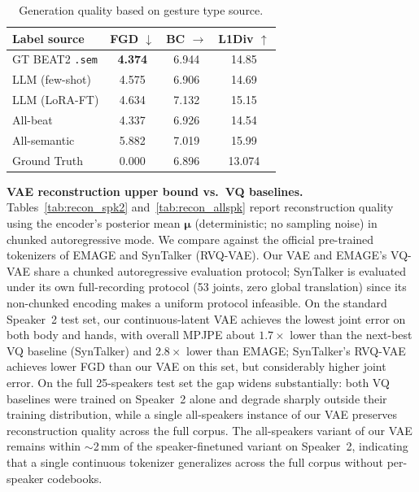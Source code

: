\begin{table}[t]
\scriptsize
\caption{Generation quality based on gesture type source.}%
\label{tab:planner_downstream}
\begin{tabular}{lccc}
\toprule
\textbf{Label source} & \textbf{FGD $\downarrow$} & \textbf{BC $\rightarrow$} & \textbf{L1Div $\uparrow$} \\
\midrule
GT BEAT2 \texttt{.sem}      & \textbf{4.374} & 6.944 & 14.85 \\
LLM (few-shot)              & 4.575          & 6.906 & 14.69 \\
LLM (LoRA-FT)               & 4.634          & 7.132 & 15.15 \\
All-beat                    & 4.337          & 6.926 & 14.54 \\
All-semantic                & 5.882          & 7.019 & 15.99 \\
\midrule
Ground Truth                & 0.000          & 6.896 & 13.074 \\
\bottomrule
\end{tabular}
\end{table}



\noindent \textbf{VAE reconstruction upper bound vs.\ VQ baselines.}
Tables~\ref{tab:recon_spk2} and~\ref{tab:recon_allspk} report reconstruction quality using the encoder's posterior mean $\boldsymbol{\mu}$ (deterministic; no sampling noise) in chunked autoregressive mode.
We compare against the official pre-trained tokenizers of EMAGE and SynTalker (RVQ-VAE).
Our VAE and EMAGE's VQ-VAE share a chunked autoregressive evaluation protocol; SynTalker is evaluated under its own full-recording protocol (53 joints, zero global translation) since its non-chunked encoding makes a uniform protocol infeasible.
On the standard Speaker~2 test set, our continuous-latent VAE achieves the lowest joint error on both body and hands, with overall MPJPE about $1.7{\times}$ lower than the next-best VQ baseline (SynTalker) and $2.8{\times}$ lower than EMAGE; SynTalker's RVQ-VAE achieves lower FGD than our VAE on this set, but considerably higher joint error.
On the full 25-speakers test set the gap widens substantially: both VQ baselines were trained on Speaker~2 alone and degrade sharply outside their training distribution, while a single all-speakers instance of our VAE preserves reconstruction quality across the full corpus.
The all-speakers variant of our VAE remains within $\sim$2\,mm of the speaker-finetuned variant on Speaker~2, indicating that a single continuous tokenizer generalizes across the full corpus without per-speaker codebooks.

